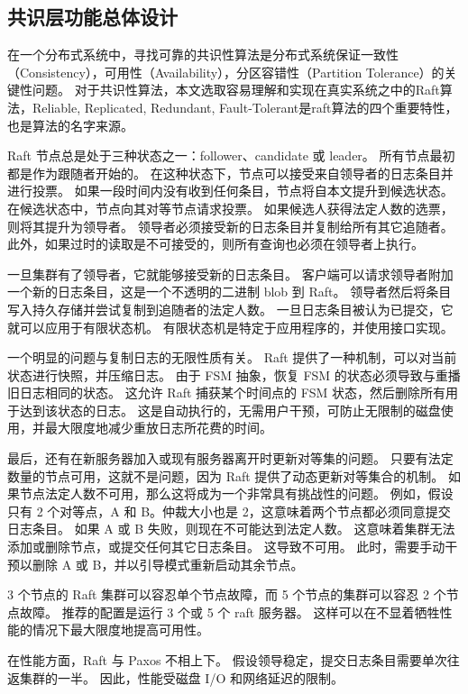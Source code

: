     \subsection{共识层功能总体设计}	
    在一个分布式系统中，寻找可靠的共识性算法是分布式系统保证一致性（Consistency），可用性（Availability），分区容错性（Partition Tolerance）的关键性问题。
    对于共识性算法，本文选取容易理解和实现在真实系统之中的Raft算法，Reliable, Replicated, Redundant, Fault-Tolerant是raft算法的四个重要特性，也是算法的名字来源。
    
    Raft 节点总是处于三种状态之一：follower、candidate 或 leader。 
    所有节点最初都是作为跟随者开始的。 在这种状态下，节点可以接受来自领导者的日志条目并进行投票。 
    如果一段时间内没有收到任何条目，节点将自本文提升到候选状态。 在候选状态中，节点向其对等节点请求投票。 
    如果候选人获得法定人数的选票，则将其提升为领导者。 领导者必须接受新的日志条目并复制给所有其它追随者。 
    此外，如果过时的读取是不可接受的，则所有查询也必须在领导者上执行。

    一旦集群有了领导者，它就能够接受新的日志条目。 
    客户端可以请求领导者附加一个新的日志条目，这是一个不透明的二进制 blob 到 Raft。 
    领导者然后将条目写入持久存储并尝试复制到追随者的法定人数。 
    一旦日志条目被认为已提交，它就可以应用于有限状态机。 
    有限状态机是特定于应用程序的，并使用接口实现。
    
    一个明显的问题与复制日志的无限性质有关。 
    Raft 提供了一种机制，可以对当前状态进行快照，并压缩日志。 
    由于 FSM 抽象，恢复 FSM 的状态必须导致与重播旧日志相同的状态。 
    这允许 Raft 捕获某个时间点的 FSM 状态，然后删除所有用于达到该状态的日志。 
    这是自动执行的，无需用户干预，可防止无限制的磁盘使用，并最大限度地减少重放日志所花费的时间。
    
    最后，还有在新服务器加入或现有服务器离开时更新对等集的问题。 
    只要有法定数量的节点可用，这就不是问题，因为 Raft 提供了动态更新对等集合的机制。 
    如果节点法定人数不可用，那么这将成为一个非常具有挑战性的问题。 
    例如，假设只有 2 个对等点，A 和 B。仲裁大小也是 2，这意味着两个节点都必须同意提交日志条目。 
    如果 A 或 B 失败，则现在不可能达到法定人数。 
    这意味着集群无法添加或删除节点，或提交任何其它日志条目。 
    这导致不可用。 此时，需要手动干预以删除 A 或 B，并以引导模式重新启动其余节点。
    
    3 个节点的 Raft 集群可以容忍单个节点故障，而 5 个节点的集群可以容忍 2 个节点故障。 
    推荐的配置是运行 3 个或 5 个 raft 服务器。 这样可以在不显着牺牲性能的情况下最大限度地提高可用性。
    
    在性能方面，Raft 与 Paxos 不相上下。 
    假设领导稳定，提交日志条目需要单次往返集群的一半。 
    因此，性能受磁盘 I/O 和网络延迟的限制。

